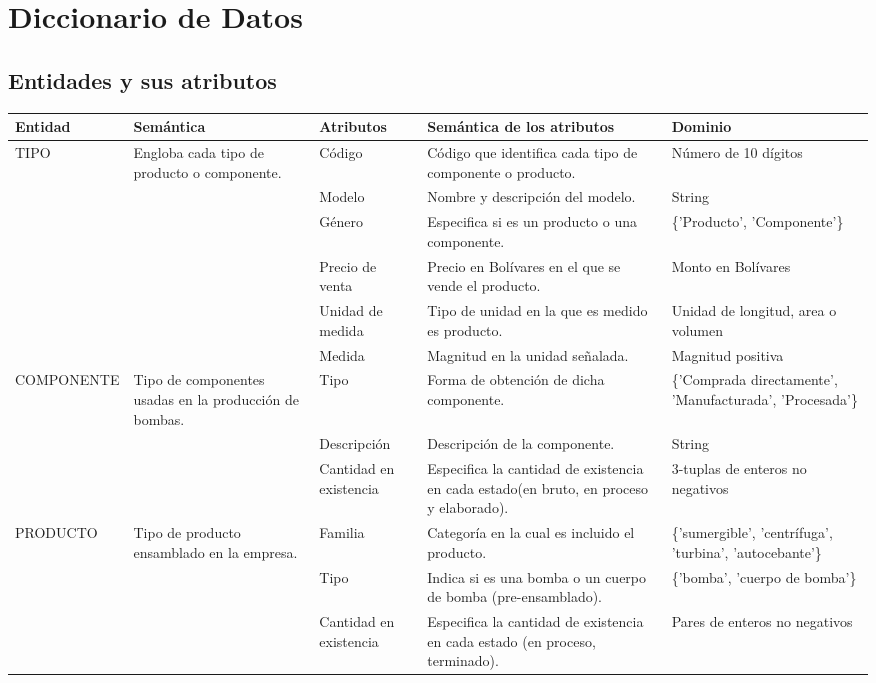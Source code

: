 \documentclass[]{report}
\begin{document}
	
	\chapter*{Diccionario de Datos}
	 \section*{\centering Entidades y sus atributos}
	
	\begin{center}
		\begin{tabular}{| p{2.5cm} | p{4.5cm} | p{2cm} | p{5cm} | p{3cm}|}
					\hline
			Entidad & Semántica & Atributos & Semántica de los atributos & Dominio \\ \hline
			
			TIPO & Engloba cada tipo de producto o componente. & 
			
			Código & Código que identifica cada tipo de componente o producto. & Número de 10 dígitos\\ \cline{3-5}
			&& Modelo & Nombre y descripción del modelo. & String\\ \cline{3-5}
			&& Género & Especifica si es un producto o una componente. & \{'Producto', 'Componente'\} \\ \cline{3-5}
			&& Precio de venta & Precio en Bolívares en el que se vende el producto.& Monto en Bolívares\\ \cline{3-5}
			&& Unidad de medida & Tipo de unidad en la que es medido es producto.&Unidad de longitud, area o volumen\\ \cline{3-5}
			&& Medida & Magnitud en la unidad señalada.& Magnitud positiva\\ \cline{3-5}
			\hline
			
			
			
			COMPONENTE & Tipo de componentes usadas en la producción de bombas. &
			Tipo & Forma de obtención de dicha componente.& \{'Comprada directamente', 'Manufacturada', 'Procesada'\}\\ \cline{3-5}
			&& Descripción & Descripción de la componente.& String\\ \cline{3-5}
			&& Cantidad en existencia & Especifica la cantidad de existencia en cada estado(en bruto, en proceso y elaborado).& 3-tuplas de enteros no negativos\\ \cline{3-5}
			\hline
			
			PRODUCTO & Tipo de producto ensamblado en la empresa. &
			Familia & Categoría en la cual es incluido el producto.& \{'sumergible', 'centrífuga', 'turbina', 'autocebante'\}\\ \cline{3-5}
			&& Tipo & Indica si es una bomba o un cuerpo de bomba (pre-ensamblado).& \{'bomba', 'cuerpo de bomba'\}\\ \cline{3-5}
			&& Cantidad en existencia & Especifica la cantidad de existencia en cada estado (en proceso, terminado).& Pares de enteros no negativos\\ \cline{3-5}
			\hline
			

\end{tabular}
\end{center}
\end{document}
